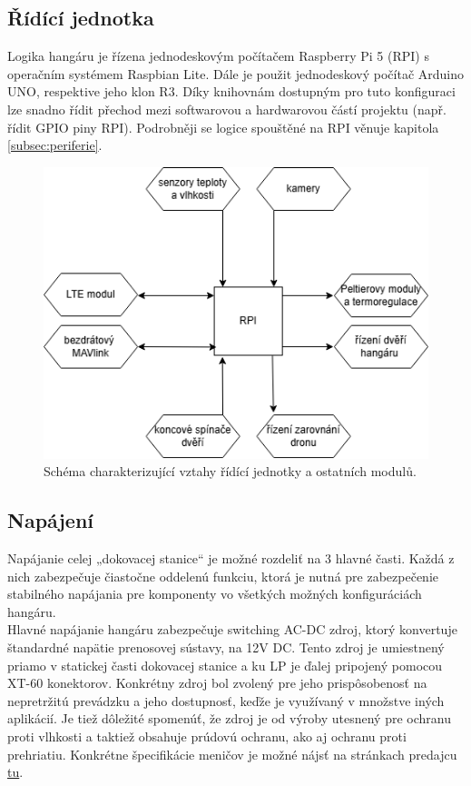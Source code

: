 \documentclass[a4paper]{article}
\begin{document}
    \subsection{Řídící jednotka}
        Logika hangáru je řízena jednodeskovým počítačem Raspberry Pi 5 (\acs{RPI}) s operačním systémem Raspbian Lite. Dále je použit jednodeskový počítač Arduino \acs{UNO}, respektive jeho klon R3. Díky knihovnám dostupným pro tuto konfiguraci lze snadno řídit přechod mezi softwarovou a hardwarovou částí projektu (např. řídit GPIO piny \acs{RPI}). Podrobněji se logice spouštěné na \acs{RPI} věnuje kapitola \ref{subsec:periferie}.

        \begin{figure}[h!]
            \centering
            \includegraphics[width=0.75\linewidth]{schematics/Logic scheme.png}
            \caption{Schéma charakterizující vztahy řídící jednotky a ostatních modulů.}
        \end{figure}

    \subsection{Napájení} \label{subsec:napajeni}
        Napájanie celej „dokovacej stanice“ je možné rozdeliť na 3 hlavné časti. Každá z nich zabezpečuje čiastočne oddelenú funkciu, ktorá je nutná pre zabezpečenie stabilného napájania pre komponenty vo všetkých možných konfiguráciách hangáru.\\

        \noindent
        Hlavné napájanie hangáru zabezpečuje switching AC-DC zdroj, ktorý konvertuje štandardné napätie prenosovej sústavy, na 12V DC. Tento zdroj je umiestnený priamo v statickej časti dokovacej stanice a ku \acs{LP} je ďalej pripojený pomocou XT-60 konektorov. Konkrétny zdroj bol zvolený pre jeho prispôsobenosť na nepretržitú prevádzku a jeho dostupnosť, keďže je využívaný v množstve iných aplikácií. Je tiež dôležité spomenúť, že zdroj je od výroby utesnený pre ochranu proti vlhkosti a taktiež obsahuje prúdovú ochranu, ako aj ochranu proti prehriatiu. Konkrétne špecifikácie meničov je možné nájsť na stránkach predajcu \href{https://www.t-led.cz/p/led-zdroj-12v-600w-slim-12v-600w-56135}{tu}.\\
\end{document}
